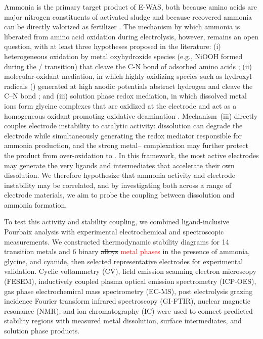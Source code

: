 \documentclass[twoside,twocolumn,9pt]{article}
\begin{document}
Ammonia is the primary target product of E-WAS, both because amino acids are major nitrogen constituents of activated sludge and because recovered ammonia can be directly valorized as fertilizer \cite{Jafari2022ElectrochemicalProduction}. The mechanism by which ammonia is liberated from amino acid oxidation during electrolysis, however, remains an open question, with at least three hypotheses proposed in the literature: (i) heterogeneous oxidation by metal oxyhydroxide species (e.g., NiOOH formed during the / transition) that cleave the C-N bond of adsorbed amino acids \cite{VEDHARATHINAM2012292}; (ii) molecular-oxidant mediation, in which highly oxidizing species such as hydroxyl radicals () generated at high anodic potentials abstract hydrogen and cleave the C--N bond \cite{Mahne_2017}; and (iii) solution phase redox mediation, in which dissolved metal ions form glycine complexes that are oxidized at the electrode and act as a homogeneous oxidant promoting oxidative deamination \cite{doi:10.1021/cr030717f,B409929J,doi:10.1021/jp803961s}. Mechanism~(iii) directly couples electrode instability to catalytic activity: dissolution can degrade the electrode while simultaneously generating the redox mediator responsible for ammonia production, and the strong metal-- complexation may further protect the product from over-oxidation to . In this framework, the most active electrodes may generate the very ligands and intermediates that accelerate their own dissolution. We therefore hypothesize that ammonia activity and electrode instability may be correlated, and by investigating both across a range of electrode materials, we aim to probe the coupling between dissolution and ammonia formation.

To test this activity and stability coupling, we combined ligand-inclusive Pourbaix analysis with experimental electrochemical and spectroscopic measurements. We constructed thermodynamic stability diagrams for 14 transition metals and 6 binary \sout{alloys} \textcolor{red}{metal phases} in the presence of ammonia, glycine, and cyanide, then selected representative electrodes for experimental validation. Cyclic voltammetry (CV), field emission scanning electron microscopy (FESEM), inductively coupled plasma optical emission spectrometry (ICP-OES), gas phase electrochemical mass spectrometry (EC-MS), post electrolysis grazing incidence Fourier transform infrared spectroscopy (GI-FTIR), nuclear magnetic resonance (NMR), and ion chromatography (IC) were used to connect predicted stability regions with measured metal dissolution, surface intermediates, and solution phase products.
\end{document}
